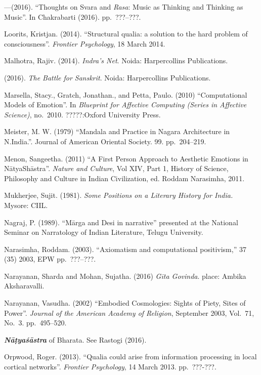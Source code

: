 \begin{thebibliography}{99}
---\kern3pt(2016). “Thoughts on Svara and \textsl{Rasa}: Music as Thinking and Thinking as Music”. In Chakrabarti (2016). pp.~???--???.

Loorits, Kristjan. (2014). “Structural qualia: a solution to the hard problem of consciousness”. \textsl{Frontier Psychology}, 18 March 2014.

Malhotra, Rajiv. (2014). \textsl{Indra’s Net}. Noida: Harpercollins Publications.

\kern3pt(2016). \textsl{The Battle for Sanskrit}. Noida: Harpercollins Publications.

Marsella, Stacy., Gratch, Jonathan., and Petta, Paulo. (2010) “Computational Models of Emotion”. In \textsl{Blueprint for Affective Computing (Series in Affective Science)}, no.~2010. ?????:Oxford University Press.

Meister, M. W. (1979) “Mandala and Practice in Nagara Architecture in N.India.”. Journal of American Oriental Society. 99. pp.~204--219.

Menon, Sangeetha. (2011) “A First Person Approach to Aesthetic Emotions in NātyaShāstra”. \textsl{Nature and Culture}, Vol XIV, Part 1, History of Science, Philosophy and Culture in Indian Civilization, ed. Roddam Narasimha, 2011.

Mukherjee, Sujit. (1981). \textsl{Some Positions on a Literary History for India.} Mysore: CIIL.

Nagraj, P. (1989). “Mārga and Desi in narrative” presented at the National Seminar on Narratology of Indian Literature, Telugu University.

Narasimha, Roddam. (2003). “Axiomatism and computational positivism,” 37 (35) 2003, EPW pp.~???--???.

Narayanan, Sharda and Mohan, Sujatha. (2016) \textsl{Gīta Govinda}. place: Ambika Aksharavalli.

Narayanan, Vasudha. (2002) “Embodied Cosmologies: Sights of Piety, Sites of Power”. \textsl{Journal of the American Academy of Religion}, September 2003, Vol.~71, No.~3. pp.~495--520.

{\sl\bfseries Nāṭyaśāstra} of Bharata. See Rastogi (2016).

Orpwood, Roger. (2013). “Qualia could arise from information processing in local cortical networks”. \textsl{Frontier Psychology}, 14 March 2013. pp.~???-???.


\end{thebibliography}
